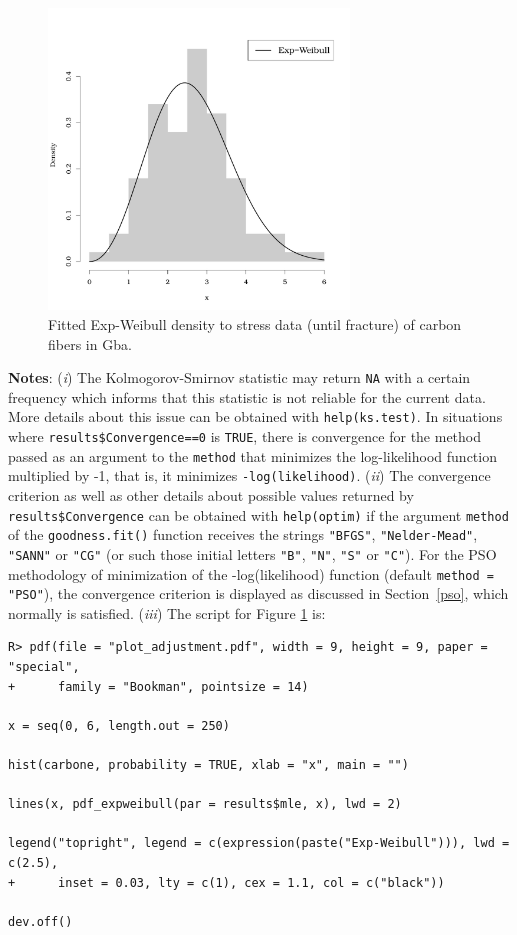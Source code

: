 \documentclass[10pt,letterpaper]{article}
\begin{document}
\begin{figure}[H]
\centering
\includegraphics[width=8cm,height=8cm]{histogram_carbon}
\caption{Fitted Exp-Weibull density to stress data (until fracture) of carbon fibers in Gba.}
\label{plot_ajustament}
\end{figure}


\hspace{-0.6cm}\textbf{Notes}: ({\it i}) The Kolmogorov-Smirnov statistic may return \texttt{NA} with a certain frequency which informs that this 
statistic is not reliable for the current data. More details about this issue can be obtained with \texttt{help(ks.test)}. In situations where \texttt{results\$Convergence==0} is \texttt{TRUE}, there is convergence for the method passed as an argument to the \texttt{method} that minimizes the log-likelihood function multiplied by -1, that is, it minimizes \texttt{-log(likelihood)}.  ({\it ii}) The convergence criterion as well as other details about possible values returned by \texttt{results\$Convergence} can be obtained with \texttt{help(optim)} if the argument \texttt{method} of the \texttt{goodness.fit()} function receives the strings \texttt{"BFGS"}, \texttt{"Nelder-Mead"}, \texttt{"SANN"} or \texttt{"CG"} (or such those initial letters \texttt{"B"}, \texttt{"N"}, \texttt{"S"} or \texttt{"C"}). For the PSO methodology of minimization of the -log(likelihood) function (default \texttt{method = "PSO"}), the convergence criterion is displayed as discussed in Section~\ref{pso}, which normally is satisfied.  ({\it iii}) The script for Figure \ref{plot_ajustament} is:

\begin{verbatim}
R> pdf(file = "plot_adjustment.pdf", width = 9, height = 9, paper = "special",
+      family = "Bookman", pointsize = 14)

x = seq(0, 6, length.out = 250)

hist(carbone, probability = TRUE, xlab = "x", main = "")

lines(x, pdf_expweibull(par = results$mle, x), lwd = 2)

legend("topright", legend = c(expression(paste("Exp-Weibull"))), lwd = c(2.5),
+      inset = 0.03, lty = c(1), cex = 1.1, col = c("black"))

dev.off()
\end{verbatim}
\end{document}
